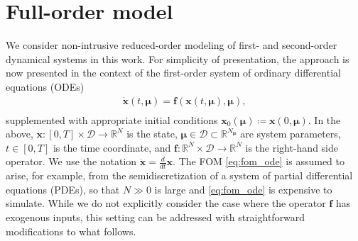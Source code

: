 \documentclass[3p,computermodern,11pt]{elsarticle}
\numberwithin{equation}{section}
\newcommand{\inputs}{\boldsymbol u}
\newcommand{\reducedState}{\hat{\state}}
\newcommand{\reducedStateCoDomain}{\RR{\romDim}}
\newcommand{\reducedVelocity}{\skew{4}\hat{\velocity}}
\newcommand{\state}{\boldsymbol x}
\newcommand{\velocity}{\boldsymbol f}
\newcommand{\params}{\boldsymbol \mu}
\newcommand{\paramDomain}{\mathcal{D}}
\newcommand{\timeDomain}{[0,T]}
\newcommand{\RR}[1]{\mathbb{R}^{#1}}
\newcommand{\fomDim}{N}
\newcommand{\romDim}{K}
\newcommand{\stateCoDomain}{\RR{\fomDim}}
\newcommand{\nParams}{N_{\params}}
\newcommand{\paramFullDomain}{\RR{\nParams}}
\begin{document}
\section{Full-order model}\label{sec:fom}
We consider non-intrusive reduced-order modeling of first- and second-order dynamical systems in this work. For simplicity of presentation, the approach is now presented in the context of the first-order system of ordinary differential equations (ODEs) 
\begin{equation}\label{eq:fom_ode}
\begin{split}
\dot{\state} \left(t,\params\right) = \velocity(\state(t,\params),\params),\\
\end{split}
\end{equation}
supplemented with appropriate initial conditions $\state_0(\params) \coloneqq \state(0,\params)$. In the above, $\state: \timeDomain \times \paramDomain \rightarrow \stateCoDomain$ is the state, $\params \in \paramDomain \subset \paramFullDomain$ are system parameters, $t \in [0,T]$ is the time coordinate, and $\velocity:  \RR{\fomDim} \times \paramDomain \rightarrow \RR{\fomDim}$ is the right-hand side operator. We use the notation $\dot{\state} = \frac{d}{dt} \state$. The FOM  \eqref{eq:fom_ode} is assumed to arise, for example, from the semidiscretization of a system of partial differential equations (PDEs), so that $N \gg 0$ is large and \eqref{eq:fom_ode} is expensive to simulate. While we do not explicitly consider the case where the operator $\velocity$ has exogenous inputs, this setting can be addressed with straightforward modifications to what follows.
\end{document}
